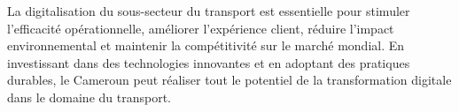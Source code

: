 La digitalisation du sous-secteur du transport est essentielle pour stimuler l'efficacité opérationnelle, améliorer l'expérience client, réduire l'impact environnemental et maintenir la compétitivité sur le marché mondial. En investissant dans des technologies innovantes et en adoptant des pratiques durables, le Cameroun peut réaliser tout le potentiel de la transformation digitale dans le domaine du transport.

